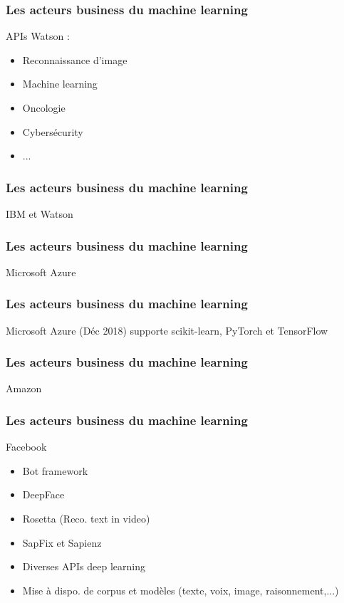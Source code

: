 \documentclass{formation}
\begin{document}
\begin{frame}
  \frametitle{Les acteurs business du machine learning}
  APIs Watson :
  \begin{itemize}
  \item Reconnaissance d'image
  \item Machine learning
  \item Oncologie
  \item Cybersécurity
  \item ...
  \end{itemize}
\end{frame}

\begin{frame}
  \frametitle{Les acteurs business du machine learning}
  IBM et Watson
\end{frame}

\begin{frame}
  \frametitle{Les acteurs business du machine learning}
  Microsoft Azure
\end{frame}

\begin{frame}
  \frametitle{Les acteurs business du machine learning}
  Microsoft Azure
  \newline
  (Déc 2018) supporte scikit-learn, PyTorch et TensorFlow
\end{frame}

\begin{frame}
  \frametitle{Les acteurs business du machine learning}
  Amazon
\end{frame}

\begin{frame}
  \frametitle{Les acteurs business du machine learning}
  Facebook
  \begin{itemize}
  \item Bot framework
  \item DeepFace
  \item Rosetta (Reco. text in video)
  \item SapFix et Sapienz 
  \item Diverses APIs deep learning
  \item Mise à dispo. de corpus et modèles (texte, voix, image, raisonnement,...)
  \end{itemize}
\end{frame}
\end{document}
